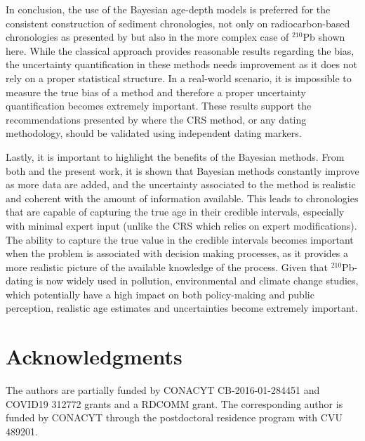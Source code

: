 \documentclass [10pt] {article}
\begin{document}
In conclusion, the use of the Bayesian age-depth models is preferred for the consistent construction of sediment chronologies, not only on radiocarbon-based chronologies as presented by \citet{Blaauw2018} but also in the more complex case of $^{210}$Pb shown here.
While the classical approach provides reasonable results regarding the bias, the uncertainty quantification in these methods needs improvement as it does not rely on a proper statistical structure. 
In a real-world scenario, it is impossible to measure the true bias of a method and therefore a proper uncertainty quantification becomes extremely important.
These results support the recommendations presented by \citet{Smith2001,Barsanti2020} where the CRS method, or any dating methodology, should be validated using independent dating markers. 

Lastly, it is important to highlight the benefits of the Bayesian methods.
From both \citet{Blaauw2018} and the present work, it is shown that Bayesian methods constantly improve as more data are added, and the uncertainty associated to the method is realistic and coherent with the amount of information available. 
This leads to chronologies that are capable of capturing the true age in their credible intervals, especially with minimal expert input (unlike the CRS which relies on expert modifications). 
The ability to capture the true value in the credible intervals becomes important when the problem is associated with decision making processes, as it provides a more realistic picture of the available knowledge of the process. 
Given that $^{210}$Pb-dating is now widely used in pollution, environmental and climate change studies, which potentially have a high impact on both policy-making and public perception, realistic age estimates and uncertainties become extremely important.

\section{Acknowledgments}

The authors are partially funded by CONACYT CB-2016-01-284451 and COVID19 312772 grants and a RDCOMM grant.
The corresponding author is funded by CONACYT through the postdoctoral residence program with CVU  489201.




\newpage


\end{document}
